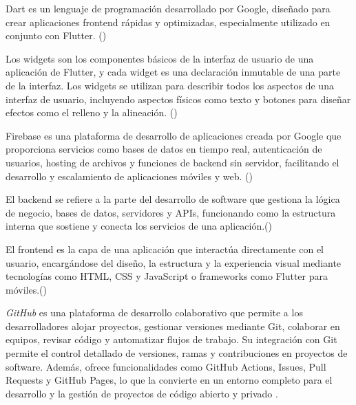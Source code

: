 \begin{definition}[Dart]

Dart es un lenguaje de programación desarrollado por Google, diseñado para crear aplicaciones frontend rápidas y optimizadas, especialmente utilizado en conjunto con Flutter. (\cite{dart})
\end{definition}

\begin{definition}[Widget]

Los widgets son los componentes básicos de la interfaz de usuario de una aplicación de Flutter, y cada widget es una declaración inmutable de una parte de la interfaz. Los widgets se utilizan para describir todos los aspectos de una interfaz de usuario, incluyendo aspectos físicos como texto y botones para diseñar efectos como el relleno y la alineación. (\cite{flutter_multiplataforma})
\end{definition}



\begin{definition}[Firebase]

Firebase es una plataforma de desarrollo de aplicaciones creada por Google que proporciona servicios como bases de datos en tiempo real, autenticación de usuarios, hosting de archivos y funciones de backend sin servidor, facilitando el desarrollo y escalamiento de aplicaciones móviles y web. (\cite{firebase})
\end{definition}


\begin{definition}[Backend]
El backend se refiere a la parte del desarrollo de software que gestiona la lógica de negocio, bases de datos, servidores y APIs, funcionando como la estructura interna que sostiene y conecta los servicios de una aplicación.(\cite{backend})
\end{definition}



\begin{definition}[Frontend]
  El frontend es la capa de una aplicación que interactúa directamente con el usuario, encargándose del diseño, la estructura y la experiencia visual mediante tecnologías como HTML, CSS y JavaScript o frameworks como Flutter para móviles.(\cite{frontend})
\end{definition}


\begin{definition}[GitHub]
  \textit{GitHub} es una plataforma de desarrollo colaborativo que permite a los desarrolladores alojar proyectos, gestionar versiones mediante Git, colaborar en equipos, revisar código y automatizar flujos de trabajo. Su integración con Git permite el control detallado de versiones, ramas y contribuciones en proyectos de software. Además, ofrece funcionalidades como GitHub Actions, Issues, Pull Requests y GitHub Pages, lo que la convierte en un entorno completo para el desarrollo y la gestión de proyectos de código abierto y privado \cite{githubdocs}.
\end{definition}


